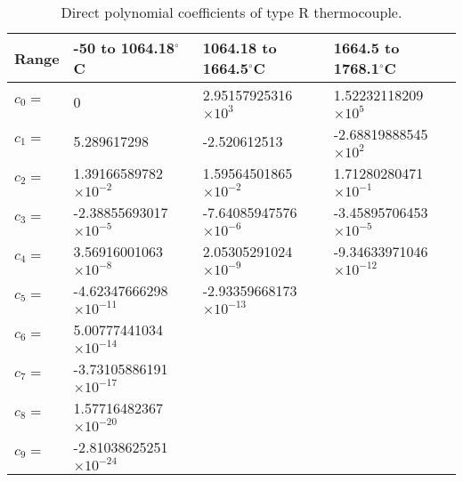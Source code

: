 \begin{table}[ht]
  \centering
  \small
  \caption{Direct polynomial coefficients of type R thermocouple.}
    \begin{tabular}{llll}
    \toprule
    Range & -50 to 1064.18$^{\circ}$C & 1064.18 to 1664.5$^{\circ}$C & 1664.5 to 1768.1$^{\circ}$C \\
    \midrule
    $c_0=$ & 0     & 2.95157925316$\times10^{3}$ & 1.52232118209$\times10^{5}$ \\
    $c_1=$ & 5.289617298 & -2.520612513 & -2.68819888545$\times10^{2}$ \\
    $c_2=$ & 1.39166589782$\times10^{-2}$ & 1.59564501865$\times10^{-2}$ & 1.71280280471$\times10^{-1}$ \\
    $c_3=$ & -2.38855693017$\times10^{-5}$ & -7.64085947576$\times10^{-6}$ & -3.45895706453$\times10^{-5}$ \\
    $c_4=$ & 3.56916001063$\times10^{-8}$ & 2.05305291024$\times10^{-9}$ & -9.34633971046$\times10^{-12}$ \\
    $c_5=$ & -4.62347666298$\times10^{-11}$ & -2.93359668173$\times10^{-13}$ &  \\
    $c_6=$ & 5.00777441034$\times10^{-14}$ &       &  \\
    $c_7=$ & -3.73105886191$\times10^{-17}$ &       &  \\
    $c_8=$ & 1.57716482367$\times10^{-20}$ &       &  \\
    $c_9=$ & -2.81038625251$\times10^{-24}$ &       &  \\
    \bottomrule
    \end{tabular}%
  \label{tab:TypeRDirectPolynomial}%
\end{table}%


